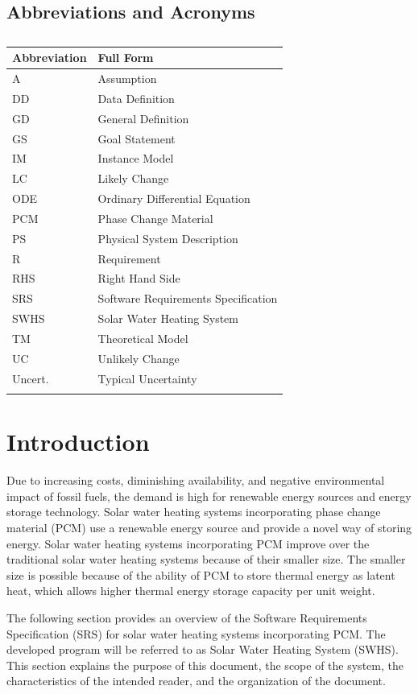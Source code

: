 \documentclass[12pt]{article}
\begin{document}
\subsection{Abbreviations and Acronyms}
\label{Sec:TAbbAcc}
\begin{longtable}{l l}
\toprule
\textbf{Abbreviation} & \textbf{Full Form}
\\
\midrule
\endhead
A & Assumption
\\
DD & Data Definition
\\
GD & General Definition
\\
GS & Goal Statement
\\
IM & Instance Model
\\
LC & Likely Change
\\
ODE & Ordinary Differential Equation
\\
PCM & Phase Change Material
\\
PS & Physical System Description
\\
R & Requirement
\\
RHS & Right Hand Side
\\
SRS & Software Requirements Specification
\\
SWHS & Solar Water Heating System
\\
TM & Theoretical Model
\\
UC & Unlikely Change
\\
Uncert. & Typical Uncertainty
\\
\bottomrule
\caption{}
\label{Table:TAbbAcc}
\end{longtable}
\section{Introduction}
\label{Sec:Intro}
Due to increasing costs, diminishing availability, and negative environmental impact of fossil fuels, the demand is high for renewable energy sources and energy storage technology. Solar water heating systems incorporating phase change material (PCM) use a renewable energy source and provide a novel way of storing energy. Solar water heating systems incorporating PCM improve over the traditional solar water heating systems because of their smaller size. The smaller size is possible because of the ability of PCM to store thermal energy as latent heat, which allows higher thermal energy storage capacity per unit weight.

The following section provides an overview of the Software Requirements Specification (SRS) for solar water heating systems incorporating PCM. The developed program will be referred to as Solar Water Heating System (SWHS). This section explains the purpose of this document, the scope of the system, the characteristics of the intended reader, and the organization of the document.
\end{document}
